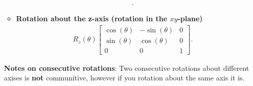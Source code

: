 \documentclass{report}
\begin{document}
\begin{itemize}
\begin{itemize}
\begin{align*}
                    .\end{align*}
                \item \textbf{Rotation about the z-axis (rotation in the $xy$-plane)}
                    \begin{align*}
                        R_{z}(\theta ) \begin{bmatrix} \cos{\left(\theta \right)} & -\sin{\left(\theta \right)} & 0 \\ \sin{\left(\theta \right)} & \cos{\left(\theta \right)} & 0 \\ 0 & 0 & 1\end{bmatrix}
                    .\end{align*}
            \end{itemize}
            \bigbreak \noindent 
            \textbf{Notes on consecutive rotations}: Two consecutive rotations about different axises is \textbf{not} communitive, however if you rotation about the same axis it is.
    \end{itemize}





    
\end{document}
